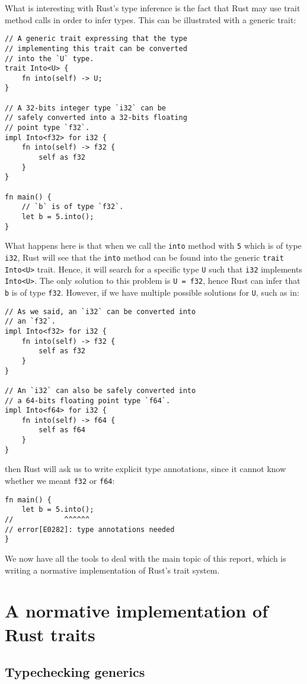 \documentclass[twocolumn]{article}
\newcommand{\rust}[1]{\texttt{#1}}
\begin{document}
What is interesting with Rust's type inference is the fact that Rust may use trait method calls in order to infer types. This can be illustrated with a generic trait:
\begin{verbatim}
// A generic trait expressing that the type
// implementing this trait can be converted
// into the `U` type.
trait Into<U> {
    fn into(self) -> U;
}

// A 32-bits integer type `i32` can be
// safely converted into a 32-bits floating
// point type `f32`.
impl Into<f32> for i32 {
    fn into(self) -> f32 {
        self as f32
    }
}

fn main() {
    // `b` is of type `f32`.
    let b = 5.into();
}
\end{verbatim}
What happens here is that when we call the \rust{into} method with \rust{5} which is of type \rust{i32}, Rust will see that the \rust{into} method can be found into the generic \rust{trait Into<U>} trait. Hence, it will search for a specific type \rust{U} such that \rust{i32} implements \rust{Into<U>}. The only solution to this problem is \rust{U = f32}, hence Rust can infer that \rust{b} is of type \rust{f32}. However, if we have multiple possible solutions for \rust{U}, such as in:
\begin{verbatim}
// As we said, an `i32` can be converted into
// an `f32`.
impl Into<f32> for i32 {
    fn into(self) -> f32 {
        self as f32
    }
}

// An `i32` can also be safely converted into
// a 64-bits floating point type `f64`.
impl Into<f64> for i32 {
    fn into(self) -> f64 {
        self as f64
    }
}
\end{verbatim}
then Rust will ask us to write explicit type annotations, since it cannot know whether we meant \rust{f32} or \rust{f64}:
\begin{verbatim}
fn main() {
    let b = 5.into();
//            ^^^^^^
// error[E0282]: type annotations needed
}
\end{verbatim}

We now have all the tools to deal with the main topic of this report, which is writing a normative implementation of Rust's trait system.

\section{A normative implementation of Rust traits}
\subsection{Typechecking generics} \label{typeck}
\end{document}
